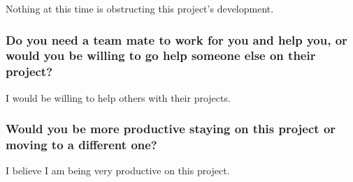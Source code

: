 \documentclass[letterpaper]{article}            %
\begin{document}
Nothing at this time is obstructing this project's development.

\subsubsection{Do you need a team mate to work for you and help you, or would you be willing to go help someone else on their project?}

I would be willing to help others with their projects.

\subsubsection{Would you be more productive staying on this project or moving to a different one?}

I believe I am being very productive on this project.
\end{document}
